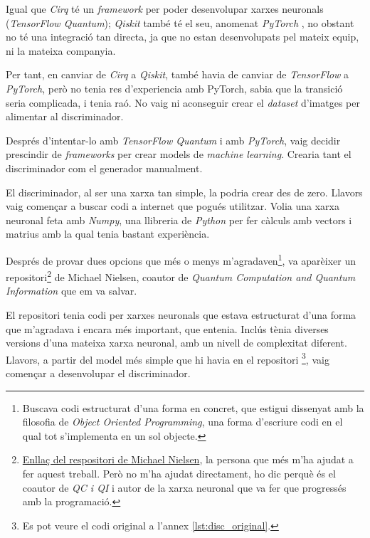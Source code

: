 Igual que \textit{Cirq} té un \textit{framework} per poder desenvolupar xarxes neuronals (\textit{TensorFlow Quantum}); \textit{Qiskit} també té el seu, anomenat \textit{PyTorch} \cite{pytorch_2019}, no obstant no té una integració tan directa, ja que no estan desenvolupats pel mateix equip, ni la mateixa companyia.

Per tant, en canviar de \textit{Cirq} a \textit{Qiskit}, també havia de canviar de \textit{TensorFlow} a \textit{PyTorch}, però no tenia res d'experiencia amb PyTorch, sabia que la transició seria complicada, i tenia raó. No vaig ni aconseguir crear el \textit{dataset} d'imatges per alimentar al discriminador.

Després d'intentar-lo amb \textit{TensorFlow Quantum} i amb \textit{PyTorch}, vaig decidir prescindir de \textit{frameworks} per crear models de \textit{machine learning}. Crearia tant el discriminador com el generador manualment. 

El discriminador, al ser una xarxa tan simple, la podria crear des de zero. Llavors vaig començar a buscar codi a internet que pogués utilitzar. Volia una xarxa neuronal feta amb \textit{Numpy}, una llibreria de \textit{Python} per fer càlculs amb vectors i matrius amb la qual tenia bastant experiència.

Després de provar dues opcions que més o menys m'agradaven\footnote{Buscava codi estructurat d'una forma en concret, que estigui dissenyat amb la filosofia de \textit{Object Oriented Programming}, una forma d'escriure codi en el qual tot s'implementa en un sol objecte.}, va aparèixer un repositori\footnote{\href{https://github.com/mnielsen/neural-networks-and-deep-learning}{Enllaç del respositori de Michael Nielsen}, la persona que més m'ha ajudat a fer aquest treball. Però no m'ha ajudat directament, ho dic perquè és el coautor de \textit{QC i QI} \cite{QCandQI} i autor de la xarxa neuronal que va fer que progressés amb la programació. } de Michael Nielsen, coautor de \textit{Quantum Computation and Quantum Information} \cite{QCandQI} que em va salvar. 

El repositori tenia codi per xarxes neuronals que estava estructurat d'una forma que m'agradava i encara més important, que entenia. Inclús tènia diverses versions d'una mateixa xarxa neuronal, amb un nivell de complexitat diferent. Llavors, a partir del model més simple que hi havia en el repositori \footnote{Es pot veure el codi original a l'annex \ref{lst:disc_original}.}, vaig començar a desenvolupar el discriminador.

